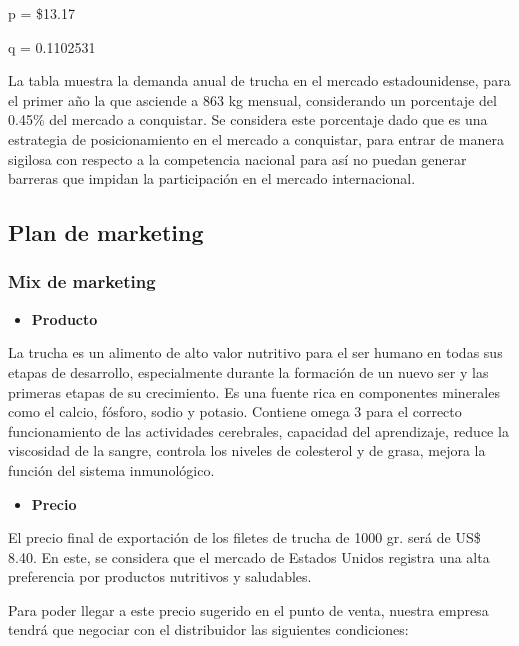 \documentclass[
  stu,
  floatsintext,
  longtable,
  a4paper,
  nolmodern,
  notxfonts,
  notimes,
  colorlinks=true,linkcolor=blue,citecolor=blue,urlcolor=blue]{apa7}
\providecommand{\tightlist}{%
  \setlength{\itemsep}{0pt}\setlength{\parskip}{0pt}}
\begin{document}
p = \$13.17

q = 0.1102531

La tabla muestra la demanda anual de trucha en el mercado
estadounidense, para el primer año la que asciende a 863 kg mensual,
considerando un porcentaje del 0.45\% del mercado a conquistar. Se
considera este porcentaje dado que es una estrategia de posicionamiento
en el mercado a conquistar, para entrar de manera sigilosa con respecto
a la competencia nacional para así no puedan generar barreras que
impidan la participación en el mercado internacional.

\subsection{Plan de marketing}\label{plan-de-marketing}

\subsubsection{Mix de marketing}\label{mix-de-marketing}

\begin{itemize}
\tightlist
\item
  \hspace{0pt} \textbf{Producto}
\end{itemize}

La trucha es un alimento de alto valor nutritivo para el ser humano en
todas sus etapas de desarrollo, especialmente durante la formación de un
nuevo ser y las primeras etapas de su crecimiento. Es una fuente rica en
componentes minerales como el calcio, fósforo, sodio y potasio. Contiene
omega 3 para el correcto funcionamiento de las actividades cerebrales,
capacidad del aprendizaje, reduce la viscosidad de la sangre, controla
los niveles de colesterol y de grasa, mejora la función del sistema
inmunológico.

\begin{itemize}
\tightlist
\item
  \hspace{0pt} \textbf{Precio}
\end{itemize}

El precio final de exportación de los filetes de trucha de 1000 gr. será
de US\$ 8.40. En este, se considera que el mercado de Estados Unidos
registra una alta preferencia por productos nutritivos y saludables.

Para poder llegar a este precio sugerido en el punto de venta, nuestra
empresa tendrá que negociar con el distribuidor las siguientes
condiciones:
\end{document}
